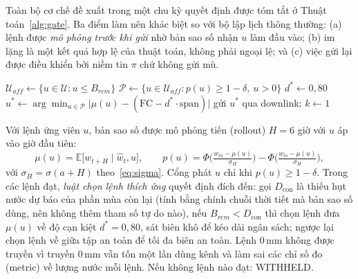\documentclass[10pt]{article}
\begin{document}
Toàn bộ cơ chế đề xuất trong một chu kỳ quyết định được tóm tắt ở Thuật toán~\ref{alg:gate}. Ba điểm làm nên khác biệt so với bộ lập lịch thông thường: (a) lệnh được \emph{mô phỏng trước khi gửi} nhờ bản sao số nhận $u$ làm đầu vào; (b) im lặng là một kết quả hợp lệ của thuật toán, không phải ngoại lệ; và (c) việc gửi lại được điều khiển bởi niềm tin $\pi$ chứ không gửi mù.

\begin{algorithm}[t]
\caption{Cổng an toàn + gửi lại T2 trong một chu kỳ quyết định (24 giờ)}
\label{alg:gate}
$\mathcal{U}_{aff} \leftarrow \{u \in \mathcal{U} : u \le B_{rem}\}$\;
$\mathcal{P} \leftarrow \{u \in \mathcal{U}_{aff} : p(u) \ge 1-\delta,\ u>0\}$\;
$d^{*} \leftarrow 0{,}80$ \;
$u^{*} \leftarrow \arg\min_{u \in \mathcal{P}} \big|\mu(u) - (\mathrm{FC} - d^{*}\cdot \mathrm{span})\big|$\;
gửi $u^{*}$ qua downlink; $k \leftarrow 1$\;
\end{algorithm}

Với lệnh ứng viên $u$, bản sao số được mô phỏng tiến (rollout) $H=6$ giờ với $u$ áp vào giờ đầu tiên:
\begin{equation}
\mu(u) = \mathbb{E}\big[w_{t+H} \mid \hat w_t, u\big], \qquad
p(u) = \Phi\!\Big(\tfrac{w_{hi}-\mu(u)}{\sigma_H}\Big) - \Phi\!\Big(\tfrac{w_{lo}-\mu(u)}{\sigma_H}\Big),
\label{eq:gate}
\end{equation}
với $\sigma_H = \sigma(a+H)$ theo~\eqref{eq:sigma}. Cổng phát $u$ chỉ khi $p(u) \ge 1-\delta$. Trong các lệnh đạt, \emph{luật chọn lệnh thích ứng} quyết định đích đến: gọi $D_{\mathrm{con}}$ là thiếu hụt nước dự báo của phần mùa còn lại (tính bằng chính chuỗi thời tiết mà bản sao số dùng, nên không thêm tham số tự do nào), nếu $B_{rem} < D_{\mathrm{con}}$ thì chọn lệnh đưa $\mu(u)$ về độ cạn kiệt $d^{*}=0{,}80$, sát biên khô để kéo dài ngân sách; ngược lại chọn lệnh về giữa tập an toàn để tối đa biên an toàn. Lệnh 0\,mm không được truyền vì truyền 0\,mm vẫn tốn một lần dùng kênh và làm sai các chỉ số đo (metric) về lượng nước mỗi lệnh. Nếu không lệnh nào đạt: WITHHELD.
\end{document}
